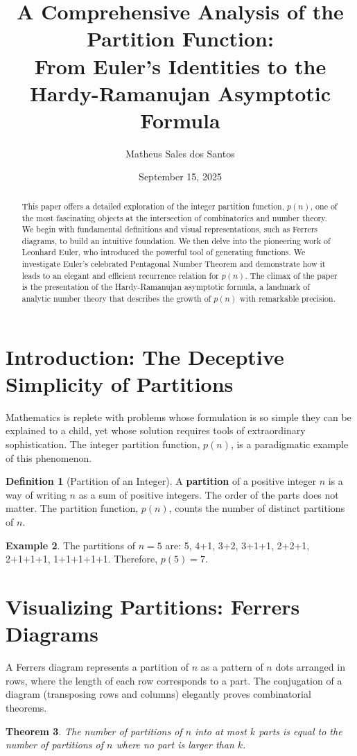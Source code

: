 \documentclass[12pt, a4paper]{article}
\title{\textbf{A Comprehensive Analysis of the Partition Function:\\ From Euler's Identities to the Hardy-Ramanujan Asymptotic Formula}}
\author{Matheus Sales dos Santos}
\date{September 15, 2025}
\newtheorem{theorem}{Theorem}[section]
\theoremstyle{definition}
\newtheorem{definition}[theorem]{Definition}
\newtheorem{example}[theorem]{Example}
\theoremstyle{remark}
\begin{document}
\maketitle

\begin{abstract}
\noindent This paper offers a detailed exploration of the integer partition function, $p(n)$, one of the most fascinating objects at the intersection of combinatorics and number theory. We begin with fundamental definitions and visual representations, such as Ferrers diagrams, to build an intuitive foundation. We then delve into the pioneering work of Leonhard Euler, who introduced the powerful tool of generating functions. We investigate Euler's celebrated Pentagonal Number Theorem and demonstrate how it leads to an elegant and efficient recurrence relation for $p(n)$. The climax of the paper is the presentation of the Hardy-Ramanujan asymptotic formula, a landmark of analytic number theory that describes the growth of $p(n)$ with remarkable precision.
\end{abstract}

\tableofcontents
\newpage

\section{Introduction: The Deceptive Simplicity of Partitions}
Mathematics is replete with problems whose formulation is so simple they can be explained to a child, yet whose solution requires tools of extraordinary sophistication. The integer partition function, $p(n)$, is a paradigmatic example of this phenomenon.
\begin{definition}[Partition of an Integer]
A \textbf{partition} of a positive integer $n$ is a way of writing $n$ as a sum of positive integers. The order of the parts does not matter. The partition function, $p(n)$, counts the number of distinct partitions of $n$.
\end{definition}
\begin{example}
The partitions of $n=5$ are: 5, 4+1, 3+2, 3+1+1, 2+2+1, 2+1+1+1, 1+1+1+1+1. Therefore, $p(5) = 7$.
\end{example}

\section{Visualizing Partitions: Ferrers Diagrams}
A Ferrers diagram represents a partition of $n$ as a pattern of $n$ dots arranged in rows, where the length of each row corresponds to a part. The conjugation of a diagram (transposing rows and columns) elegantly proves combinatorial theorems.
\begin{theorem}
The number of partitions of $n$ into at most $k$ parts is equal to the number of partitions of $n$ where no part is larger than $k$.
\end{theorem}
\end{document}
